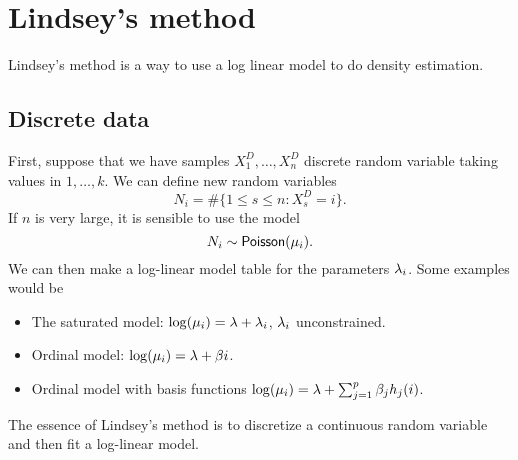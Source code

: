 \section{Lindsey's method}
Lindsey's method is a way to use a log linear model to do density estimation.
\subsection{Discrete data}
First, suppose that we have samples $X_1^D,\ldots,X_n^D$ discrete random variable taking values in $1,\ldots,k$. We can define new random variables
\[N_{i}= \#\{1 \le s \le n : X_s^D=i\}. \]
If $n$ is very large, it is sensible to use the model
\[N_i \sim \mathsf{Poisson}(\mu_i). \]
We can then make a log-linear model table for the parameters $\lambda_i$. Some examples would be 
\begin{itemize}
    \item The saturated model: $\log(\mu_i) = \lambda+\lambda_i$, $\lambda_i$ unconstrained. 
    \item Ordinal model: $\log(\mu_i) = \lambda+\beta i$.
    \item Ordinal model with basis functions $\log(\mu_i) = \lambda + \sum_{j=1}^p \beta_j h_j(i)$.
\end{itemize}
The essence of Lindsey's method is to discretize a continuous random variable and then fit a log-linear model.
